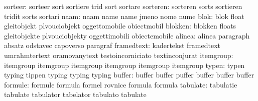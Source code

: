                   sorteer: sorteer                   sort
                           sortiere                  trid
                           sort                      sortare %
                 sorteren: sorteren                  sorts
                           sortieren                 tridit
                           sorts                     sortari %
                     naam: naam                      name
                           name                      jmeno
                           nome                      nume
                     blok: blok                      float
                           gleitobjekt               plvouciobjekt
                           oggettomobile             obiectmobil
                  blokken: blokken                   floats
                           gleitobjekte              plvouciobjekty
                           oggettimobili             obiectemobile
                   alinea: alinea                    paragraph
                           absatz                    odstavec
                           capoverso                 paragraf
               framedtext: kadertekst                framedtext
                           umrahmtertext             oramovanytext
                           testoincorniciato         textinconjurat
                itemgroup: itemgroup                 itemgroup
                           itemgroup                 itemgroup
                           itemgroup                 itemgroup
                    typen: typen                     typing
                           tippen                    typing
                           typing                    typing %
                   buffer: buffer                    buffer
                           puffer                    buffer
                           buffer                    buffer
                  formule: formule                   formula
                           formel                    rovnice
                           formula                   formula
                 tabulate: tabulatie                 tabulate
                           tabulator                 tabelator
                           tabulato                  tabulate

\stopsetupvariables




